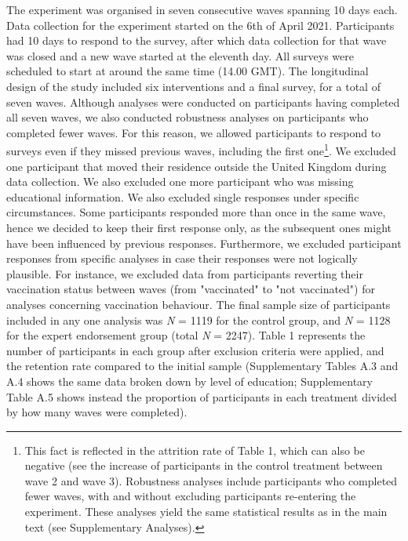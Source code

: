 \documentclass[authordate, empirical]{jote-new-article}
\begin{document}
	

	The experiment was organised in seven consecutive waves spanning 10 days each. Data collection for the experiment started on the 6th of April 2021. Participants had 10 days to respond to the survey, after which data collection for that wave was closed and a new wave started at the eleventh day. All surveys were scheduled to start at around the same time (14.00 GMT). The longitudinal design of the study included six interventions and a final survey, for a total of seven waves. Although analyses were conducted on participants having completed all seven waves, we also conducted robustness analyses on participants who completed fewer waves. For this reason, we allowed participants to respond to surveys even if they missed previous waves, including the first one\footnote{ This fact is reflected in the attrition rate of Table 1, which can also be negative (see the increase of participants in the control treatment between wave 2 and wave 3). Robustness analyses include participants who completed fewer waves, with and without excluding participants re-entering the experiment. These analyses yield the same statistical results as in the main text (see Supplementary Analyses).}. We excluded one participant that moved their residence outside the United Kingdom during data collection. We also excluded one more participant who was missing educational information. We also excluded single responses under specific circumstances. Some participants responded more than once in the same wave, hence we decided to keep their first response only, as the subsequent ones might have been influenced by previous responses. Furthermore, we excluded participant responses from specific analyses in case their responses were not logically plausible. For instance, we excluded data from participants reverting their vaccination status between waves (from "vaccinated" to "not vaccinated") for analyses concerning vaccination behaviour. The final sample size of participants included in any one analysis was \emph{N }= 1119 for the control group, and \emph{N }= 1128 for the expert endorsement group (total \emph{N }= 2247). Table 1 represents the number of participants in each group after exclusion criteria were applied, and the retention rate compared to the initial sample (Supplementary Tables A.3 and A.4 shows the same data broken down by level of education; Supplementary Table A.5 shows instead the proportion of participants in each treatment divided by how many waves were completed).
\end{document}
